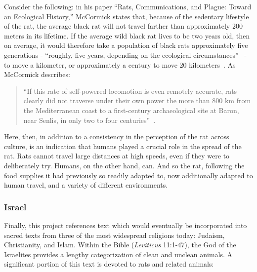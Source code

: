 \documentclass[12pt]{article}
\begin{document}
Consider the following: in his paper ``Rats, Communications, and Plague: Toward an Ecological History,'' McCormick states that, because of the sedentary lifestyle of the rat, the average black rat will not travel farther than approximately 200 meters in its lifetime. If the average wild black rat lives to be two years old, then on average, it would therefore take a population of black rats approximately five generations - ``roughly, five years, depending on the ecological circumstances''~\cite{McCormick2003} - to move a kilometer, or approximately a century to move 20 kilometers~\cite{McCormick2003}. As McCormick describes:

\begin{quote}
``If this rate of self-powered locomotion is even remotely accurate, rats clearly did not traverse under their own power the more than 800 km from the Mediterranean coast to a first-century archaeological site at Baron, near Senlis, in only two to four centuries''~\cite{McCormick2003}.
\end{quote}

Here, then, in addition to a consistency in the perception of the rat across culture, is an indication that humans played a crucial role in the spread of the rat. Rats cannot travel large distances at high speeds, even if they were to deliberately try. Humans, on the other hand, can. And so the rat, following the food supplies it had previously so readily adapted to, now additionally adapted to human travel, and a variety of different environments.

\subsubsection{Israel} \label{Israel}

Finally, this project references text which would eventually be incorporated into sacred texts from three of the most widespread religions today: Judaism, Christianity, and Islam. Within the Bible (\textit{Leviticus} 11:1-47), the God of the Israelites provides a lengthy categorization of clean and unclean animals. A significant portion of this text is devoted to rats and related animals:
\end{document}
